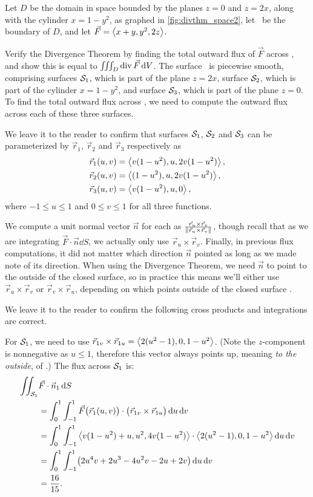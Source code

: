 \begin{example}\label{ex_divthm_space2}%
Let $D$ be the domain in space bounded by the planes $z=0$ and $z=2x$, along with the cylinder $x=1-y^2$, as graphed in \autoref{fig:divthm_space2}, let \surfaceS\ be the boundary of $D$, and let $\vec F =\left\langle x+y,y^2, 2z\right\rangle$. 

Verify the Divergence Theorem by finding the total outward flux of $\vec F$ across \surfaceS, and show this is equal to $\iiint_D \operatorname{div}\vec F\operatorname{d}\! V$.
\solution
The surface \surfaceS\ is piecewise smooth, comprising surfaces $\mathcal{S}_1$, which is part of the plane $z=2x$, surface $\mathcal{S}_2$, which is part of the cylinder $x=1-y^2$, and surface $\mathcal{S}_3$, which is part of the plane $z=0$. To find the total outward flux across \surfaceS, we need to compute the outward flux across each of these three surfaces.

We leave it to the reader to confirm that surfaces $\mathcal{S}_1$, $\mathcal{S}_2$ and $\mathcal{S}_3$ can be parameterized by $\vec r_1$, $\vec r_2$ and $\vec r_3$ respectively as
\begin{align*}
\vec r_1(u,v) &=\left\langle v(1-u^2), u, 2v(1-u^2)\right\rangle, \\
\vec r_2(u,v) &=\left\langle (1-u^2), u, 2v(1-u^2)\right\rangle,\\
\vec r_3(u,v) &=\left\langle v(1-u^2), u, 0\right\rangle,
\end{align*}
where $-1\leq u\leq 1$ and $0\leq v\leq 1$ for all three functions.

We compute a unit normal vector $\vec n$ for each as $\frac{\vec r_u\times\vec r_v}{\left\lVert \vec r_u\times\vec r_v \right\rVert}$, though recall that as we are integrating $\vec F\cdot \vec n\dd S$, we actually only use $\vec r_u\times\vec r_v$. Finally, in previous flux computations, it did not matter which direction $\vec n$ pointed as long as we made note of its direction. When using the Divergence Theorem, we need $\vec n$ to point to the outside of the closed surface, so in practice this means we'll either use $\vec r_u\times\vec r_v$ or $\vec r_v\times\vec r_u$, depending on which points outside of the closed surface \surfaceS.

We leave it to the reader to confirm the following cross products and integrations are correct.

For $\mathcal{S}_1$, we need to use $\vec r_{1v}\times\vec r_{1u} =\left\langle 2(u^2-1),0,1-u^2\right\rangle$. (Note the $z$-component is nonnegative as $u\leq 1$, therefore this vector always points up, meaning \emph{to the outside}, of \surfaceS.) The flux across $\mathcal{S}_1$ is:
\begin{align*}
	\iint_{\mathcal{S}_1} &\vec F\cdot \vec n_1\operatorname{d}\! S
	 \\
	&= \int_0^1\int_{-1}^1 \vec F\bigl(\vec r_1(u,v)\bigr)\cdot \bigl(\vec r_{1v}\times\vec r_{1u}\bigr)\operatorname{d}\! u\operatorname{d}\! v\\
	&= \int_0^1\int_{-1}^1\left\langle v(1-u^2)+u, u^2,4v(1-u^2)\right\rangle\cdot\left\langle 2(u^2-1),0,1-u^2\right\rangle\operatorname{d}\! u\operatorname{d}\! v\\
	&= \int_0^1\int_{-1}^1 \bigl(2u^4v+2u^3-4u^2v-2u+2v\bigr)\operatorname{d}\! u\operatorname{d}\! v\\
	&= \frac{16}{15}.
\end{align*}


\end{example}
